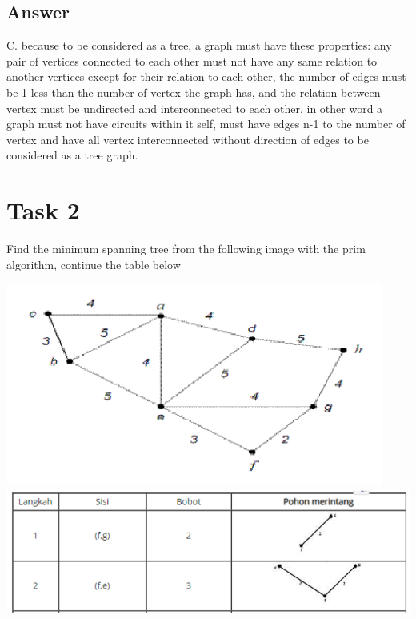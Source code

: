 \documentclass[12pt,titlepage]{article}
\begin{document}
\subsection*{Answer}
C. because to be considered as a tree, a graph must have these properties: any pair of vertices connected to each other must not have any same relation to another vertices except for their relation to each other, the number of edges must be 1 less than the number of vertex the graph has, and the relation between vertex must be undirected and interconnected to each other. in other word a graph must not have circuits within it self, must have edges n-1 to the number of vertex and have all vertex interconnected without direction of edges to be considered as a tree graph.  

\newpage

\section*{Task 2}
Find the minimum spanning tree from the following image with the prim algorithm, continue the table below
\begin{center}
    \includegraphics[width=.6\textwidth]{images/figures/fig2.png}\\
    \includegraphics[width=.8\textwidth]{images/figures/fig3.png}\\
\end{center}
\end{document}
